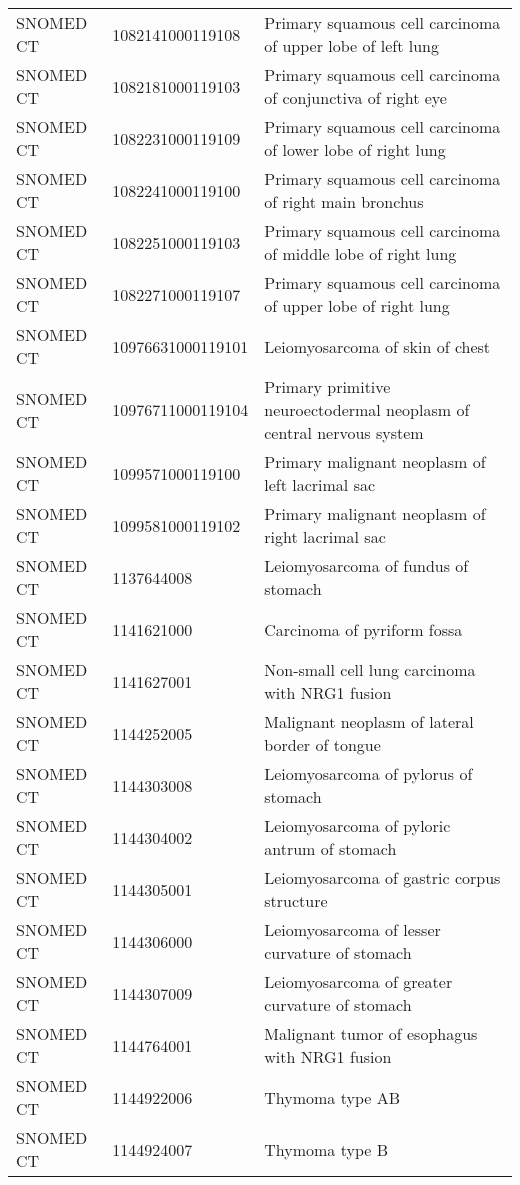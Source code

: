 \begin{longtable}{p{}p{}p{}}
  SNOMED CT & 1082141000119108 & Primary squamous cell carcinoma of upper lobe of left lung \\ 
  SNOMED CT & 1082181000119103 & Primary squamous cell carcinoma of conjunctiva of right eye \\ 
  SNOMED CT & 1082231000119109 & Primary squamous cell carcinoma of lower lobe of right lung \\ 
  SNOMED CT & 1082241000119100 & Primary squamous cell carcinoma of right main bronchus \\ 
  SNOMED CT & 1082251000119103 & Primary squamous cell carcinoma of middle lobe of right lung \\ 
  SNOMED CT & 1082271000119107 & Primary squamous cell carcinoma of upper lobe of right lung \\ 
  SNOMED CT & 10976631000119101 & Leiomyosarcoma of skin of chest \\ 
  SNOMED CT & 10976711000119104 & Primary primitive neuroectodermal neoplasm of central nervous system \\ 
  SNOMED CT & 1099571000119100 & Primary malignant neoplasm of left lacrimal sac \\ 
  SNOMED CT & 1099581000119102 & Primary malignant neoplasm of right lacrimal sac \\ 
  SNOMED CT & 1137644008 & Leiomyosarcoma of fundus of stomach \\ 
  SNOMED CT & 1141621000 & Carcinoma of pyriform fossa \\ 
  SNOMED CT & 1141627001 & Non-small cell lung carcinoma with NRG1 fusion \\ 
  SNOMED CT & 1144252005 & Malignant neoplasm of lateral border of tongue \\ 
  SNOMED CT & 1144303008 & Leiomyosarcoma of pylorus of stomach \\ 
  SNOMED CT & 1144304002 & Leiomyosarcoma of pyloric antrum of stomach \\ 
  SNOMED CT & 1144305001 & Leiomyosarcoma of gastric corpus structure \\ 
  SNOMED CT & 1144306000 & Leiomyosarcoma of lesser curvature of stomach \\ 
  SNOMED CT & 1144307009 & Leiomyosarcoma of greater curvature of stomach \\ 
  SNOMED CT & 1144764001 & Malignant tumor of esophagus with NRG1 fusion \\ 
  SNOMED CT & 1144922006 & Thymoma type AB \\ 
  SNOMED CT & 1144924007 & Thymoma type B \\ 

\end{longtable}
